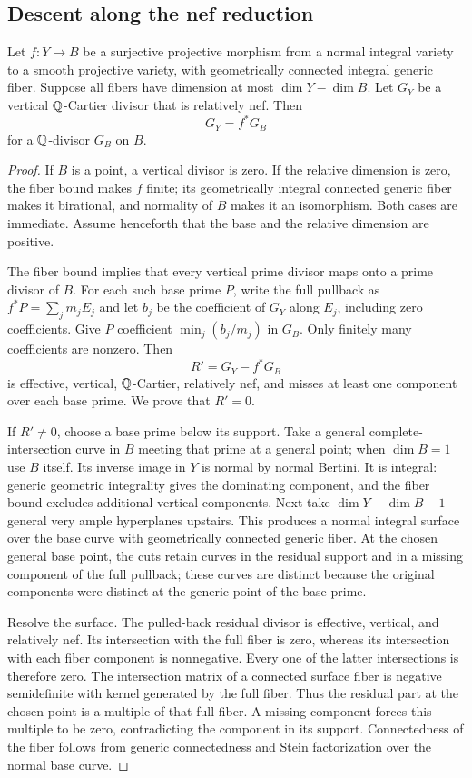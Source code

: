 \subsection{Descent along the nef reduction}

\begin{lemma}\label{proj:sg:vertical-descent}
Let $f:Y\to B$ be a surjective projective morphism from a
normal integral variety to a smooth projective variety,
with geometrically connected integral generic fiber.
Suppose all fibers have dimension at most
$\dim Y-\dim B$.  Let $G_Y$ be a vertical $\mathbb{Q}$-Cartier
divisor that is relatively nef.  Then
\[
 G_Y=f^*G_B
\]
for a $\mathbb{Q}$-divisor $G_B$ on $B$.
\end{lemma}

\begin{proof}
If $B$ is a point, a vertical divisor is zero.  If the
relative dimension is zero, the fiber bound makes $f$
finite; its geometrically integral connected generic
fiber makes it birational, and normality of $B$ makes
it an isomorphism.  Both cases are immediate.  Assume
henceforth that the base and the relative dimension
are positive.

The fiber bound implies that every vertical prime divisor
maps onto a prime divisor of $B$.  For each such base
prime $P$, write the full pullback as
$f^*P=\sum_jm_jE_j$ and let $b_j$ be the coefficient of
$G_Y$ along $E_j$, including zero coefficients.
Give $P$ coefficient $\min_j(b_j/m_j)$ in $G_B$.
Only finitely many coefficients are nonzero.  Then
\[
 R'=G_Y-f^*G_B
\]
is effective, vertical, $\mathbb{Q}$-Cartier, relatively nef,
and misses at least one component over each base prime.
We prove that $R'=0$.

If $R'\ne0$, choose a base prime below its support.
Take a general complete-intersection curve in $B$
meeting that prime at a general point; when $\dim B=1$
use $B$ itself.  Its inverse image in $Y$ is normal
by normal Bertini.  It is integral: generic geometric
integrality gives the dominating component, and the
fiber bound excludes additional vertical components.
Next take $\dim Y-\dim B-1$ general very ample
hyperplanes upstairs.  This produces a normal integral
surface over the base curve with geometrically connected
generic fiber.  At the chosen general base point,
the cuts retain curves in the residual support and in
a missing component of the full pullback; these curves
are distinct because the original components were
distinct at the generic point of the base prime.

Resolve the surface.  The pulled-back residual divisor
is effective, vertical, and relatively nef.  Its
intersection with the full fiber is zero, whereas its
intersection with each fiber component is nonnegative.
Every one of the latter intersections is therefore zero.
The intersection matrix of a connected surface fiber
is negative semidefinite with kernel generated by the
full fiber.  Thus the residual part at the chosen point
is a multiple of that full fiber.  A missing component
forces this multiple to be zero, contradicting the
component in its support.  Connectedness of the fiber
follows from generic connectedness and Stein
factorization over the normal base curve.
\end{proof}

